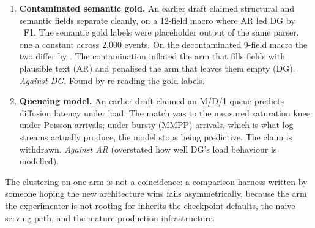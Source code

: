 \begin{enumerate}
\item \textbf{Contaminated semantic gold.} An earlier draft claimed structural
and semantic fields separate cleanly, on a 12-field macro where AR led DG by
\twelveGap\ F1. The semantic gold labels were placeholder output of the same
parser, one a constant across 2{,}000 events. On the decontaminated 9-field
macro the two differ by \qualityGap. The contamination inflated the arm that
fills fields with plausible text (AR) and penalised the arm that leaves them
empty (DG). \emph{Against DG.} Found by re-reading the gold labels.

\item \textbf{Queueing model.} An earlier draft claimed an M/D/1 queue
predicts diffusion latency under load. The match was to the measured
saturation knee under Poisson arrivals; under bursty (MMPP) arrivals, which is
what log streams actually produce, the model stops being predictive. The claim
is withdrawn. \emph{Against AR} (overstated how well DG's load behaviour is
modelled).
\end{enumerate}

The clustering on one arm is not a coincidence: a comparison harness written by
someone hoping the new architecture wins fails asymmetrically, because the
arm the experimenter is not rooting for inherits the checkpoint defaults, the
naive serving path, and the mature production infrastructure.

